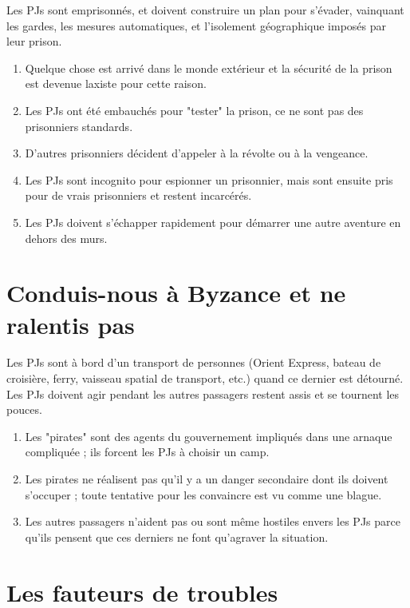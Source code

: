 \begin{multicols}{2}
Les PJs sont emprisonnés, et doivent construire un plan pour s'évader, vainquant les gardes, les mesures automatiques, et l'isolement géographique imposés par leur prison.

\themes
\begin{enumerate}
\item Quelque chose est arrivé dans le monde extérieur et la sécurité de la prison est devenue laxiste pour cette raison.
\item Les PJs ont été embauchés pour "tester" la prison, ce ne sont pas des prisonniers standards.
\item D'autres prisonniers décident d'appeler à la révolte ou à la vengeance.
\item Les PJs sont incognito pour espionner un prisonnier, mais sont ensuite pris pour de vrais prisonniers et restent incarcérés.
\item Les PJs doivent s'échapper rapidement pour démarrer une autre aventure en dehors des murs.
\end{enumerate}

\section{Conduis-nous à Byzance et ne ralentis pas}
\hypertarget{byzance}{}


Les PJs sont à bord d'un transport de personnes (Orient Express, bateau de croisière, ferry, vaisseau spatial de transport, etc.) quand ce dernier est détourné. Les PJs doivent agir pendant les autres passagers restent assis et se tournent les pouces.

\themes
\begin{enumerate}
\item Les "pirates" sont des agents du gouvernement impliqués dans une arnaque compliquée ; ils forcent les PJs à choisir un camp.
\item Les pirates ne réalisent pas qu'il y a un danger secondaire dont ils doivent s'occuper ; toute tentative pour les convaincre est vu comme une blague.
\item Les autres passagers n'aident pas ou sont même hostiles envers les PJs parce qu'ils pensent que ces derniers ne font qu'agraver la situation.
\end{enumerate}

\section{Les fauteurs de troubles}
\hypertarget{troubles}{}


\end{multicols}
